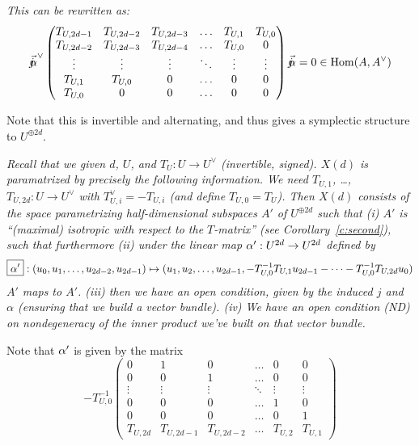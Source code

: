 { \label{c:second}
{\em This can be rewritten as:
\begin{equation}\label{eq:Tmatrix}
 \vec{\mathord{j\mkern-7mu\alpha}}^\vee
 \begin{pmatrix}
T_{U,2d-1} & T_{U,2d-2} &  T_{U,2d-3} &  \hdots & T_{U,1} & T_{U,0} \\
 T_{U,2d-2} &  T_{U,2d-3} & T_{U,2d-4} &  \hdots & T_{U,0} & 0 \\
   \vdots  & \vdots  &   \vdots  & \ddots & \vdots & \vdots \\
   T_{U,1} & T_{U,0} & 0 & \hdots & 0 & 0 \\
   T_{U,0} & 0 & 0 & \hdots & 0 & 0 
  \end{pmatrix}
 \vec{\mathord{j\mkern-7mu\alpha}} =0 \in \operatorname{Hom}(A,A^\vee)
\end{equation}
}

Note that this  is invertible and alternating, and thus gives a symplectic structure to $U^{\oplus 2d}$.


  \label{t:preliminaryform}{\em Recall that we given $d$, $U$, and $T_U: U \rightarrow U^\vee$ (invertible, signed).
  $X(d)$ is paramatrized by precisely the following information.
  We need $T_{U,1}$, \dots, $T_{U,2d}: U \rightarrow U^\vee$ with $T_{U,i}^\vee = - T_{U,i}$ (and define $T_{U,0}=T_U$). Then $X(d)$ consists of the space parametrizing half-dimensional subspaces $\boxed{A'}$ of $U^{\oplus 2d}$ such that (i)
  $A'$ is ``(maximal) isotropic with respect to the $T$-matrix'' 
 (see Corollary~\ref{c:second}), such that furthermore
(ii)  under the linear map $\alpha' : U^{2d} \rightarrow U^{2d}$ defined by  $$\boxed{\alpha'}: (u_0, u_1, \dots, u_{2d-2}, u_{2d-1}) \mapsto
 (u_1, u_2, \dots, u_{2d-1},
 -T^{-1}_{U,0} T_{U,1} u_{2d-1}  - \cdots  -T^{-1}_{U,0} T_{U,2d} u_0 )$$
 $A'$ maps to $A'$.  (iii) then we have an open condition, given by the induced $j$ and $\alpha$ (ensuring that we build a vector bundle). (iv)  We have an open condition (ND) on nondegeneracy of the inner product we've built on that vector bundle.
}

Note that $\alpha'$ is given by the matrix
$$ -T^{-1}_{U,0}
\begin{pmatrix}
  0 & 1  & 0 & \hdots &       0 &  0 \\
  0 & 0 &  1 & \hdots &       0 &  0 \\
\vdots & \vdots & \vdots & \ddots & \vdots & \vdots \\
  0 & 0 &  0 & \hdots &       1 &  0 \\
  0 & 0 &  0 & \hdots &       0 &  1 \\
 T_{U,2d} & T_{U,2d-1} & T_{U,2d-2} & \hdots & T_{U,2} & T_{U,1} 
  \end{pmatrix}
$$

}
